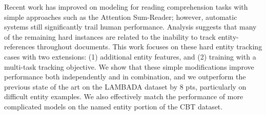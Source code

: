 Recent work has improved on modeling for reading comprehension tasks with simple approaches such as the Attention Sum-Reader; however, automatic systems still significantly trail human performance. Analysis suggests that many of the remaining hard instances are related to the inability to track entity-references throughout documents. This work focuses on these hard entity tracking cases with two extensions: (1) additional entity features, and (2) training with a multi-task tracking objective. We show that these simple modifications improve performance both independently and in combination, and we outperform the previous state of the art on the LAMBADA dataset by 8 pts, particularly on difficult entity examples. We also effectively match the performance of more complicated models on the named entity portion of the CBT dataset.

